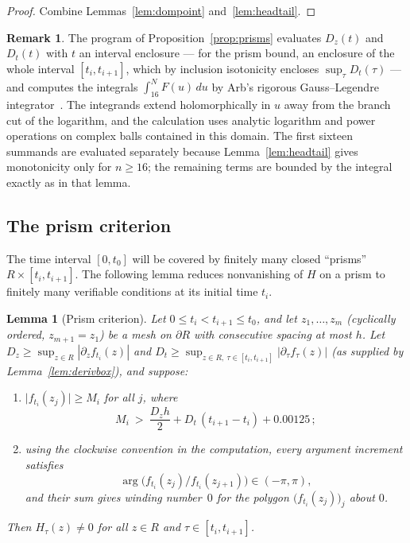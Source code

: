 \documentclass[11pt]{article}
\newtheorem{lemma}[theorem]{Lemma}
\theoremstyle{definition}
\newtheorem{remark}[theorem]{Remark}
\begin{document}
\begin{proof}
Combine Lemmas~\ref{lem:dompoint} and~\ref{lem:headtail}.
\end{proof}

\begin{remark}\label{rem:quadrature}
The program of Proposition~\ref{prop:prisms} evaluates $D_z(t)$
and $D_t(t)$ with $t$ an
interval enclosure --- for the prism bound, an enclosure of the
whole interval $[t_i,t_{i+1}]$, which by inclusion isotonicity
encloses $\sup_\tau D_t(\tau)$ --- and computes the integrals
$\int_{16}^NF(u)\,du$ by Arb's rigorous Gauss--Legendre
integrator~\cite{JohanssonIntegration}. The integrands extend
holomorphically in $u$ away from the branch cut of the logarithm, and the
calculation uses analytic logarithm and power operations on complex balls
contained in this domain.  The first sixteen summands are evaluated
separately because Lemma~\ref{lem:headtail} gives monotonicity only for
$n\ge16$; the remaining terms are bounded by the integral exactly as in that
lemma.
\end{remark}

\subsection{The prism criterion}\label{sec:prism}

The time interval $[0,t_0]$ will be covered by finitely many closed
``prisms'' $R\times[t_i,t_{i+1}]$. The following lemma reduces
nonvanishing of $H$ on a prism to finitely many verifiable
conditions at its initial time $t_i$.

\begin{lemma}[Prism criterion]\label{lem:prism}
Let $0\le t_i<t_{i+1}\le t_0$, and let $z_1,\dots,z_m$
(cyclically ordered, $z_{m+1}=z_1$) be a mesh on $\partial R$ with
consecutive spacing at most $h$. Let $D_z\ge\sup_{z\in R}|\partial_zf_{t_i}(z)|$ and
$D_t\ge\sup_{z\in R,\ \tau\in[t_i,t_{i+1}]}
|\partial_\tau f_\tau(z)|$ (as supplied by
Lemma~\ref{lem:derivbox}), and suppose:
\begin{enumerate}
\item[\textup{(a)}] $\bigl|f_{t_i}(z_j)\bigr|\ge M_i$ for all $j$,
where
\begin{equation}\label{eq:prismcondition}
M_i\ >\ \frac{D_{z}h}{2}
+D_{t}\,(t_{i+1}-t_i)+0.00125\,;
\end{equation}
\item[\textup{(b)}] using the clockwise convention in the computation, every
argument increment satisfies
\[
\arg\bigl(f_{t_i}(z_j)/f_{t_i}(z_{j+1})\bigr)\in(-\pi,\pi),
\]
and their sum gives winding number~$0$ for the polygon
$\bigl(f_{t_i}(z_j)\bigr)_j$ about $0$.
\end{enumerate}
Then $H_\tau(z)\neq0$ for all $z\in R$ and
$\tau\in[t_i,t_{i+1}]$.
\end{lemma}
\end{document}
